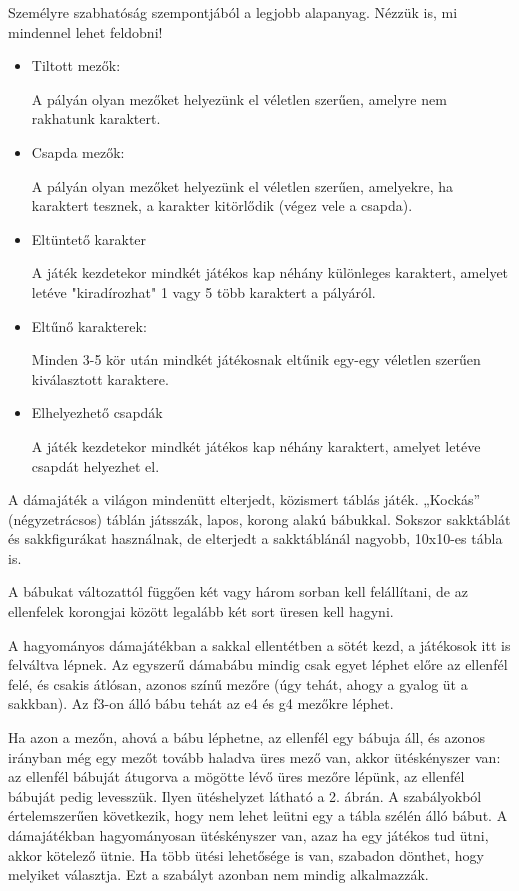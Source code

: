 
Személyre szabhatóság szempontjából a legjobb alapanyag. Nézzük is, mi mindennel lehet feldobni!
\begin{itemize}
	\item Tiltott mezők:
	
	A pályán olyan mezőket helyezünk el véletlen szerűen, amelyre nem rakhatunk karaktert.
	\item Csapda mezők:
	
	A pályán olyan mezőket helyezünk el véletlen szerűen, amelyekre, ha karaktert tesznek, a karakter kitörlődik (végez vele a csapda).
	\item Eltüntető karakter
	
	A játék kezdetekor mindkét játékos kap néhány különleges karaktert, amelyet letéve "kiradírozhat" 1 vagy 5 több karaktert a pályáról.
	\item Eltűnő karakterek:
	
	Minden 3-5 kör után mindkét játékosnak eltűnik egy-egy véletlen szerűen kiválasztott karaktere.	
	\item Elhelyezhető csapdák
	
	A játék kezdetekor mindkét játékos kap néhány karaktert, amelyet letéve csapdát helyezhet el.	
\end{itemize}



A dámajáték a világon mindenütt elterjedt, közismert táblás játék. „Kockás” (négyzetrácsos) táblán játsszák, lapos, korong alakú bábukkal. Sokszor sakktáblát és sakkfigurákat használnak, de elterjedt a sakktáblánál nagyobb, 10x10-es tábla is.

A bábukat változattól függően két vagy három sorban kell felállítani, de az ellenfelek korongjai között legalább két sort üresen kell hagyni.

A hagyományos dámajátékban a sakkal ellentétben a sötét kezd, a játékosok itt is felváltva lépnek. Az egyszerű dámabábu mindig csak egyet léphet előre az ellenfél felé, és csakis átlósan, azonos színű mezőre (úgy tehát, ahogy a gyalog üt a sakkban). Az f3-on álló bábu tehát az e4 és g4 mezőkre léphet.

Ha azon a mezőn, ahová a bábu léphetne, az ellenfél egy bábuja áll, és azonos irányban még egy mezőt tovább haladva üres mező van, akkor ütéskényszer van: az ellenfél bábuját átugorva a mögötte lévő üres mezőre lépünk, az ellenfél bábuját pedig levesszük. Ilyen ütéshelyzet látható a 2. ábrán. A szabályokból értelemszerűen következik, hogy nem lehet leütni egy a tábla szélén álló bábut. A dámajátékban hagyományosan ütéskényszer van, azaz ha egy játékos tud ütni, akkor kötelező ütnie. Ha több ütési lehetősége is van, szabadon dönthet, hogy melyiket választja. Ezt a szabályt azonban nem mindig alkalmazzák.

